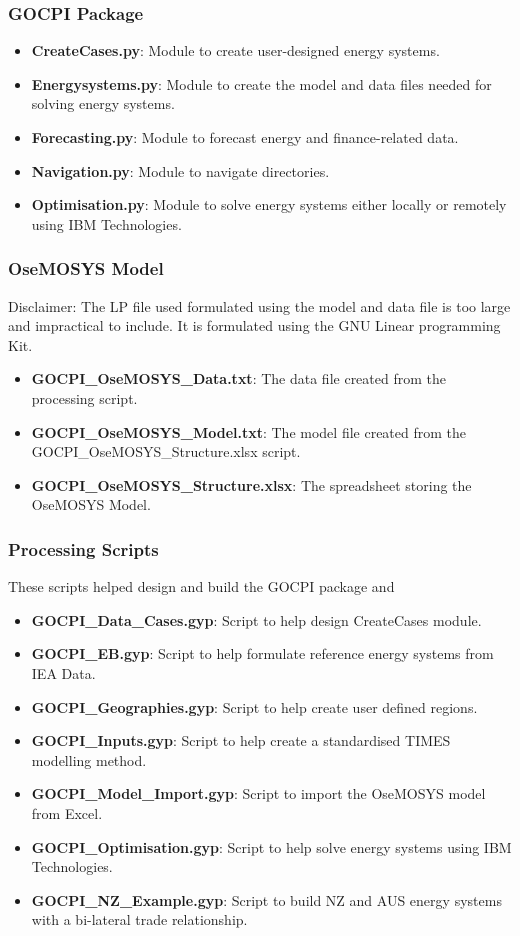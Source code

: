 \documentclass[12pt]{article}
\begin{document}
\subsubsection{GOCPI Package}
\begin{itemize}
	\item \textbf{CreateCases.py}: Module to create user-designed energy systems.
	\item \textbf{Energysystems.py}: Module to create the model and data files needed for solving energy systems.
	\item \textbf{Forecasting.py}: Module to forecast energy and finance-related data.
	\item \textbf{Navigation.py}: Module to navigate directories.
	\item \textbf{Optimisation.py}: Module to solve energy systems either locally or remotely using IBM Technologies.
\end{itemize}
\subsubsection{OseMOSYS Model}
Disclaimer: The LP file used formulated using the model and data file is too large and impractical to include.
It is formulated using the GNU Linear programming Kit.
\begin{itemize}
	\item \textbf{GOCPI\_OseMOSYS\_Data.txt}: The data file created from the processing script.
	\item \textbf{GOCPI\_OseMOSYS\_Model.txt}: The model file created from the GOCPI\_OseMOSYS\_Structure.xlsx script.
	\item \textbf{GOCPI\_OseMOSYS\_Structure.xlsx}: The spreadsheet storing the OseMOSYS Model.
\end{itemize}
\subsubsection{Processing Scripts}
These scripts helped design and build the GOCPI package and 
\begin{itemize}
	\item \textbf{GOCPI\_Data\_Cases.gyp}: Script to help design CreateCases module.
	\item \textbf{GOCPI\_EB.gyp}: Script to help formulate reference energy systems from IEA Data.
	\item \textbf{GOCPI\_Geographies.gyp}: Script to help create user defined regions.
	\item \textbf{GOCPI\_Inputs.gyp}: Script to help create a standardised TIMES modelling method.
	\item \textbf{GOCPI\_Model\_Import.gyp}: Script to import the OseMOSYS model from Excel.
	\item \textbf{GOCPI\_Optimisation.gyp}: Script to help solve energy systems using IBM Technologies.
	\item \textbf{GOCPI\_NZ\_Example.gyp}: Script to build NZ and AUS energy systems with a bi-lateral trade relationship.
\end{itemize}
\end{document}
